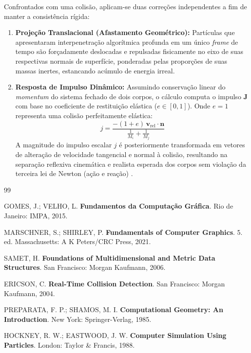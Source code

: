 \documentclass[11pt,a4paper]{article}
\begin{document}
Confrontados com uma colisão, aplicam-se duas correções independentes a fim de manter a consistência rígida:
\begin{enumerate}
    \item \textbf{Projeção Translacional (Afastamento Geométrico):} Partículas que apresentaram interpenetração algorítmica profunda em um único \textit{frame} de tempo são forçadamente deslocadas e repulsadas fisicamente no eixo de suas respectivas normais de superfície, ponderadas pelas proporções de suas massas inertes, estancando acúmulo de energia irreal.
    \item \textbf{Resposta de Impulso Dinâmico:} Assumindo conservação linear do \textit{momentum} do sistema fechado de dois corpos, o cálculo computa o impulso $\mathbf{J}$ com base no coeficiente de restituição elástica ($e \in [0, 1]$). Onde $e=1$ representa uma colisão perfeitamente elástica:
    \begin{equation}
        j = \frac{-(1 + e) \, \mathbf{v}_{\text{rel}} \cdot \mathbf{n}}{\frac{1}{M_i} + \frac{1}{M_j}}
    \end{equation}
    A magnitude do impulso escalar $j$ é posteriormente transformada em vetores de alteração de velocidade tangencial e normal à colisão, resultando na separação reflexiva cinemática e realista esperada dos corpos sem violação da terceira lei de Newton (ação e reação) \cite{ericson}.
\end{enumerate}

\begin{thebibliography}{99}

GOMES, J.; VELHO, L. \textbf{Fundamentos da Computação Gráfica}. Rio de Janeiro: IMPA, 2015.

MARSCHNER, S.; SHIRLEY, P. \textbf{Fundamentals of Computer Graphics}. 5. ed. Massachusetts: A K Peters/CRC Press, 2021.

SAMET, H. \textbf{Foundations of Multidimensional and Metric Data Structures}. San Francisco: Morgan Kaufmann, 2006.

ERICSON, C. \textbf{Real-Time Collision Detection}. San Francisco: Morgan Kaufmann, 2004.

PREPARATA, F. P.; SHAMOS, M. I. \textbf{Computational Geometry: An Introduction}. New York: Springer-Verlag, 1985.

HOCKNEY, R. W.; EASTWOOD, J. W. \textbf{Computer Simulation Using Particles}. London: Taylor \& Francis, 1988.

\end{thebibliography}
\end{document}
